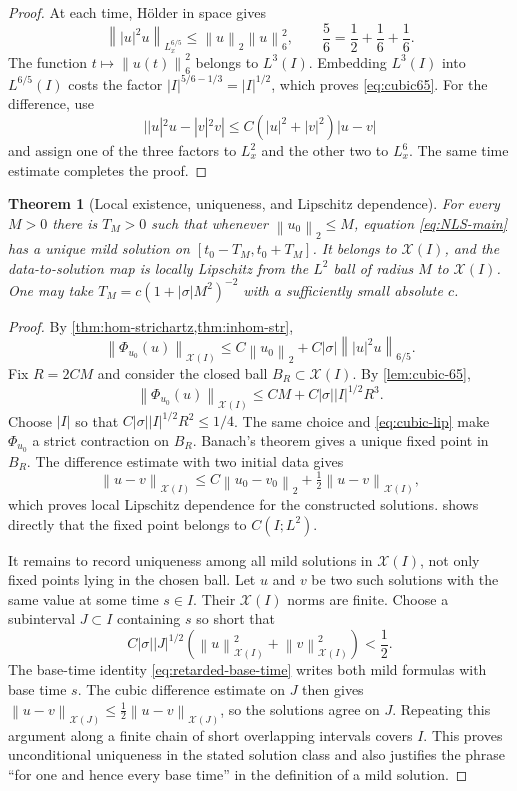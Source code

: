 \documentclass[11pt,oneside]{book}
\newtheorem{theorem}{Theorem}[chapter]
\theoremstyle{definition}
\theoremstyle{remark}
\newcommand{\1}{\mathbf 1}
\newcommand{\norm}[1]{\left\lVert #1\right\rVert}
\begin{document}
\begin{proof}
At each time, H\"older in space gives
\[
 \norm{|u|^2u}_{L^{6/5}_x}
 \le \norm u_2\norm u_6^2,
 \qquad \frac56=\frac12+\frac16+\frac16.
\]
The function $t\mapsto\norm{u(t)}_6^2$ belongs to $L^3(I)$.  Embedding
$L^3(I)$ into $L^{6/5}(I)$ costs the factor
$|I|^{5/6-1/3}=|I|^{1/2}$, which proves \eqref{eq:cubic65}.
For the difference, use
\[
 ||u|^2u-|v|^2v|
 \le C(|u|^2+|v|^2)|u-v|
\]
and assign one of the three factors to $L^2_x$ and the other two to
$L^6_x$.  The same time estimate completes the proof.
\end{proof}

\begin{theorem}[Local existence, uniqueness, and Lipschitz dependence]
\label{thm:LWP}
For every $M>0$ there is $T_M>0$ such that whenever
$\norm{u_0}_2\le M$, equation \eqref{eq:NLS-main} has a unique mild solution
on $[t_0-T_M,t_0+T_M]$.  It belongs to $\mathcal X(I)$, and the data-to-solution
map is locally Lipschitz from the $L^2$ ball of radius $M$ to
$\mathcal X(I)$.  One may take $T_M=c(1+|\sigma|M^2)^{-2}$ with a sufficiently
small absolute $c$.
\end{theorem}

\begin{proof}
By \cref{thm:hom-strichartz,thm:inhom-str},
\[
 \norm{\Phi_{u_0}(u)}_{\mathcal X(I)}
 \le C\norm{u_0}_2+C|\sigma|\norm{|u|^2u}_{6/5}.
\]
Fix $R=2CM$ and consider the closed ball
$B_R\subset\mathcal X(I)$.  By \cref{lem:cubic-65},
\[
 \norm{\Phi_{u_0}(u)}_{\mathcal X(I)}
 \le CM+C|\sigma||I|^{1/2}R^3.
\]
Choose $|I|$ so that $C|\sigma||I|^{1/2}R^2\le1/4$.  The same choice and
\eqref{eq:cubic-lip} make $\Phi_{u_0}$ a strict contraction on $B_R$.
Banach's theorem gives a unique fixed point in $B_R$.  The difference
estimate with two initial data gives
\[
 \norm{u-v}_{\mathcal X(I)}
 \le C\norm{u_0-v_0}_2+\tfrac12\norm{u-v}_{\mathcal X(I)},
\]
which proves local Lipschitz dependence for the constructed solutions.
 shows directly that the fixed point belongs to
$C(I;L^2)$.

It remains to record uniqueness among all mild solutions in
$\mathcal X(I)$, not only fixed points lying in the chosen ball.  Let
$u$ and $v$ be two such solutions with the same value at some time $s\in I$.
Their $\mathcal X(I)$ norms are finite.  Choose a subinterval $J\subset I$
containing $s$ so short that
\[
 C|\sigma||J|^{1/2}
   (\norm u_{\mathcal X(I)}^2+\norm v_{\mathcal X(I)}^2)<\frac12.
\]
The base-time identity \eqref{eq:retarded-base-time} writes both mild
formulas with base time $s$.  The cubic difference estimate on $J$ then gives
$\norm{u-v}_{\mathcal X(J)}\le\tfrac12\norm{u-v}_{\mathcal X(J)}$, so the
solutions agree on $J$.  Repeating this argument along a finite chain of
short overlapping intervals covers $I$.  This proves unconditional
uniqueness in the stated solution class and also justifies the phrase ``for
one and hence every base time'' in the definition of a mild solution.
\end{proof}
\end{document}
